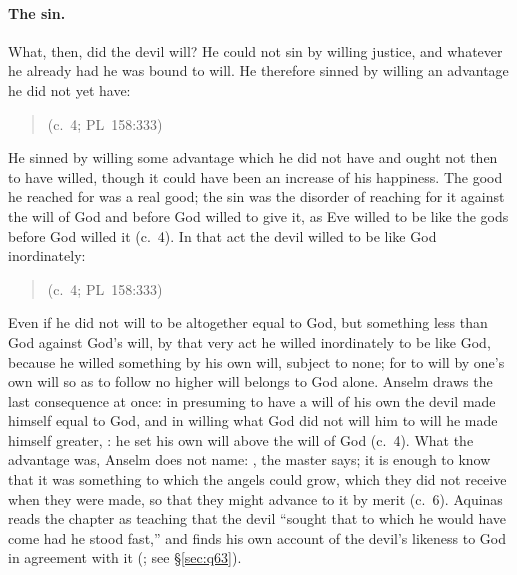 \paragraph{The sin.} What, then, did the devil will? He could not sin by
willing justice, and whatever he already had he was bound to will. He
therefore sinned by willing an advantage he did not yet have:

\begin{quote}
(c.~4; PL~158:333)
\end{quote}

\noindent He sinned by willing some advantage which he did not have and
ought not then to have willed, though it could have been an increase of his
happiness. The good he reached for was a real good; the sin was the
disorder of reaching for it against the will of God and before God willed
to give it, as Eve willed to be like the gods before God willed it (c.~4).
In that act the devil willed to be like God inordinately:

\begin{quote}
 (c.~4; PL~158:333)
\end{quote}

\noindent Even if he did not will to be altogether equal to God, but
something less than God against God's will, by that very act he willed
inordinately to be like God, because he willed something by his own will,
subject to none; for to will by one's own will so as to follow no higher
will belongs to God alone. Anselm draws the last consequence at once: in
presuming to have a will of his own the devil made himself equal to God,
and in willing what God did not will him to will he made himself greater,
: he set his own
will above the will of God (c.~4). What the advantage was, Anselm does not
name: , the master says; it is enough to
know that it was something to which the angels could grow, which they did
not receive when they were made, so that they might advance to it by merit
(c.~6). Aquinas reads the chapter as teaching that the devil ``sought that
to which he would have come had he stood fast,'' and finds his own account
of the devil's likeness to God in agreement with it (; see
\S\ref{sec:q63}).

